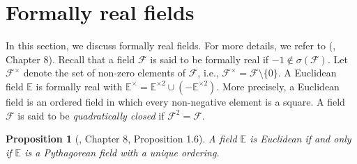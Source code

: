 \documentclass[sn-mathphys-num]{sn-jnl}%
\newtheorem{definition}[theorem]{Definition}
\newtheorem{proposition}[theorem]{Proposition}
\begin{document}

\section{Formally real fields}
In this section, we discuss formally real fields. For more details, we refer to (\cite{lam}, Chapter $8$). Recall that a field $\mathcal F$ is said to be formally real if $-1 \notin \sigma(\mathcal F)$. 
 Let $\mathcal F^\times$ denote the set of non-zero elements of $\mathcal F$, i.e., $\mathcal F^\times= \mathcal F \setminus \{0\}$. 
    A Euclidean field $\mathbb E$ is formally real with $\mathbb E^{\times}= \mathbb E^{\times 2} \cup (-\mathbb E^{\times2})$. 
    More precisely, a Euclidean field is an ordered field in which every non-negative element is a square. A field $\mathcal F$ is said to be {\it quadratically closed} if $\mathcal F^2=\mathcal F$.
\medskip 

\begin{proposition}[\cite{lam}, Chapter 8, Proposition 1.6]\label{Euclidean is Pythagorean}
    A field $\mathbb E$ is Euclidean if and only if $\mathbb E$ is a Pythagorean field with a unique ordering.
\end{proposition}
\medskip 
\end{document}

